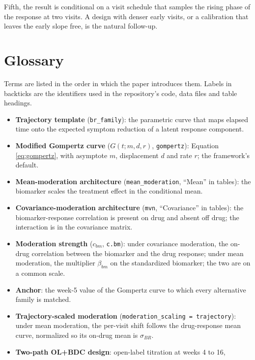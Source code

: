 \documentclass[
  11pt,
]{article}
\providecommand{\tightlist}{%
  \setlength{\itemsep}{0pt}\setlength{\parskip}{0pt}}
\begin{document}
Fifth, the result is conditional on a visit schedule that samples the
rising phase of the response at two visits. A design with denser early
visits, or a calibration that leaves the early slope free, is the
natural follow-up.

\section*{Glossary}\label{glossary}

Terms are listed in the order in which the paper introduces them.
Labels in backticks are the identifiers used in the repository's
code, data files and table headings.

\begin{itemize}
\tightlist
\item
  \textbf{Trajectory template} (\texttt{br\_family}): the parametric curve that
  maps elapsed time onto the expected symptom reduction of a latent
  response component.
\item
  \textbf{Modified Gompertz curve} (\(G(t; m, d, r)\), \texttt{gompertz}): Equation
  \eqref{eq:gompertz}, with asymptote \(m\), displacement \(d\) and rate
  \(r\); the framework's default.
\item
  \textbf{Mean-moderation architecture} (\texttt{mean\_moderation}, ``Mean'' in
  tables): the biomarker scales the treatment effect in the
  conditional mean.
\item
  \textbf{Covariance-moderation architecture} (\texttt{mvn}, ``Covariance'' in
  tables): the biomarker-response correlation is present on drug and
  absent off drug; the interaction is in the covariance matrix.
\item
  \textbf{Moderation strength} (\(c_{bm}\), \texttt{c.bm}): under covariance
  moderation, the on-drug correlation between the biomarker and the
  drug response; under mean moderation, the multiplier \(\beta_{bm}\) on
  the standardized biomarker; the two are on a common scale.
\item
  \textbf{Anchor}: the week-5 value of the Gompertz curve to which every
  alternative family is matched.
\item
  \textbf{Trajectory-scaled moderation} (\texttt{moderation\_scaling\ =\ \textquotesingle{}trajectory\textquotesingle{}}): under mean moderation, the per-visit shift follows
  the drug-response mean curve, normalized so its on-drug mean is
  \(\sigma_{BR}\).
\item
  \textbf{Two-path OL+BDC design}: open-label titration at weeks 4 to 16,

\end{itemize}
\end{document}
